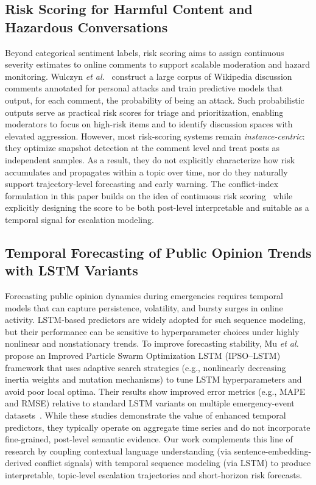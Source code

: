 \documentclass[journal]{IEEEtran}
\begin{document}
\subsection{Risk Scoring for Harmful Content and Hazardous Conversations}
Beyond categorical sentiment labels, risk scoring aims to assign continuous severity estimates to online comments to support scalable moderation and hazard monitoring. Wulczyn \emph{et al.}~\cite{Wulczyn2017} construct a large corpus of Wikipedia discussion comments annotated for personal attacks and train predictive models that output, for each comment, the probability of being an attack. Such probabilistic outputs serve as practical risk scores for triage and prioritization, enabling moderators to focus on high-risk items and to identify discussion spaces with elevated aggression. However, most risk-scoring systems remain \emph{instance-centric}: they optimize snapshot detection at the comment level and treat posts as independent samples. As a result, they do not explicitly characterize how risk accumulates and propagates within a topic over time, nor do they naturally support trajectory-level forecasting and early warning. The conflict-index formulation in this paper builds on the idea of continuous risk scoring~\cite{ghosh2024safespeech} while explicitly designing the score to be both post-level interpretable and suitable as a temporal signal for escalation modeling.

\subsection{Temporal Forecasting of Public Opinion Trends with LSTM Variants}
Forecasting public opinion dynamics during emergencies requires temporal models that can capture persistence, volatility, and bursty surges in online activity. LSTM-based predictors are widely adopted for such sequence modeling, but their performance can be sensitive to hyperparameter choices under highly nonlinear and nonstationary trends. To improve forecasting stability, Mu \emph{et al.}~\cite{Mu2023IPSO} propose an Improved Particle Swarm Optimization LSTM (IPSO--LSTM) framework that uses adaptive search strategies (e.g., nonlinearly decreasing inertia weights and mutation mechanisms) to tune LSTM hyperparameters and avoid poor local optima. Their results show improved error metrics (e.g., MAPE and RMSE) relative to standard LSTM variants on multiple emergency-event datasets~\cite{Mu2023IPSO}. While these studies demonstrate the value of enhanced temporal predictors, they typically operate on aggregate time series and do not incorporate fine-grained, post-level semantic evidence. Our work complements this line of research by coupling contextual language understanding (via sentence-embedding-derived conflict signals) with temporal sequence modeling (via LSTM) to produce interpretable, topic-level escalation trajectories and short-horizon risk forecasts.
\end{document}
